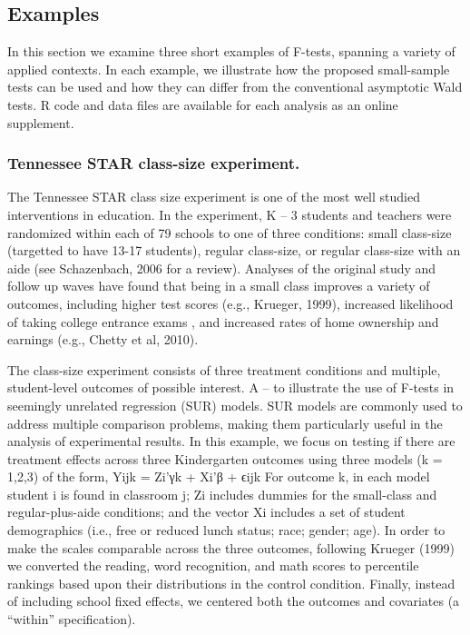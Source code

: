 \documentclass[12pt]{article}\usepackage[]{graphicx}\usepackage[]{color}
\begin{document}
\subsection{Examples}
\label{subsec:examples_F}

In this section we examine three short examples of F-tests, spanning a variety of applied contexts. In each example, we illustrate how the proposed small-sample tests can be used and how they can differ from the conventional asymptotic Wald tests. R code and data files are available for each analysis as an online supplement.

\subsubsection{Tennessee STAR class-size experiment.} 

The Tennessee STAR class size experiment is one of the most well studied interventions in education.  In the experiment, K – 3 students and teachers were randomized within each of 79 schools to one of three conditions: small class-size (targetted to have 13-17 students), regular class-size, or regular class-size with an aide (see Schazenbach, 2006 for a review). Analyses of the original study and follow up waves have found that being in a small class improves a variety of outcomes, including higher test scores (e.g., Krueger, 1999), increased likelihood of taking college entrance exams \citep{Krueger2001effect}, and increased rates of home ownership and earnings (e.g., Chetty et al, 2010). 

The class-size experiment consists of three treatment conditions and multiple, student-level outcomes of possible interest. A  – to illustrate the use of F-tests in seemingly unrelated regression (SUR) models. SUR models are commonly used to address multiple comparison problems, making them particularly useful in the analysis of experimental results.  In this example, we focus on testing if there are treatment effects across three Kindergarten outcomes using three models (k = 1,2,3) of the form,
	Yijk = Zi’γk + Xi’β + ϵijk
For outcome k, in each model student i is found in classroom j; Zi includes dummies for the small-class and regular-plus-aide conditions; and the vector Xi includes a set of student demographics (i.e., free or reduced lunch status; race; gender; age). In order to make the scales comparable across the three outcomes, following Krueger (1999) we converted the reading, word recognition, and math scores to percentile rankings based upon their distributions in the control condition. Finally, instead of including school fixed effects, we centered both the outcomes and covariates (a “within” specification).
\end{document}
